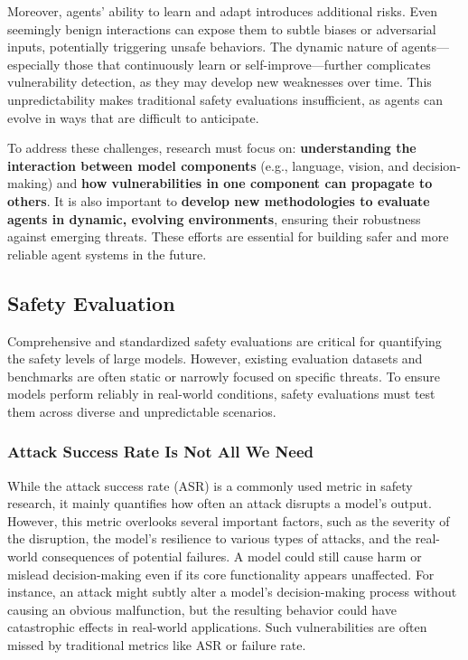 Moreover, agents' ability to learn and adapt introduces additional risks. Even seemingly benign interactions can expose them to subtle biases or adversarial inputs, potentially triggering unsafe behaviors. The dynamic nature of agents—especially those that continuously learn or self-improve—further complicates vulnerability detection, as they may develop new weaknesses over time. This unpredictability makes traditional safety evaluations insufficient, as agents can evolve in ways that are difficult to anticipate.

To address these challenges, research must focus on: \textbf{understanding the interaction between model components} (e.g., language, vision, and decision-making) and \textbf{how vulnerabilities in one component can propagate to others}. 
It is also important to \textbf{develop new methodologies to evaluate agents in dynamic, evolving environments}, ensuring their robustness against emerging threats.
These efforts are essential for building safer and more reliable agent systems in the future.


\subsection{Safety Evaluation}

Comprehensive and standardized safety evaluations are critical for quantifying the safety levels of large models. However, existing evaluation datasets and benchmarks are often static or narrowly focused on specific threats. To ensure models perform reliably in real-world conditions, safety evaluations must test them across diverse and unpredictable scenarios. 

\subsubsection{Attack Success Rate Is Not All We Need}

While the attack success rate (ASR) is a commonly used metric in safety research, it mainly quantifies how often an attack disrupts a model's output. However, this metric overlooks several important factors, such as the severity of the disruption, the model’s resilience to various types of attacks, and the real-world consequences of potential failures. A model could still cause harm or mislead decision-making even if its core functionality appears unaffected. For instance, an attack might subtly alter a model’s decision-making process without causing an obvious malfunction, but the resulting behavior could have catastrophic effects in real-world applications. Such vulnerabilities are often missed by traditional metrics like ASR or failure rate.

